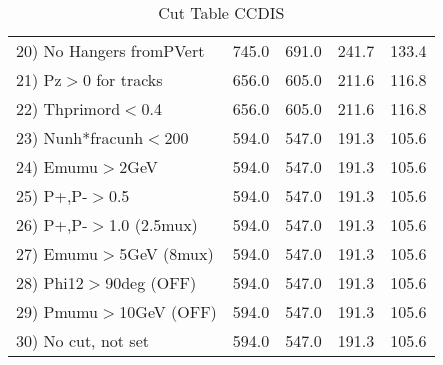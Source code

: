 \begin{table}[h!]
\begin{tabular}{||l||r|r|r|r||}
 20) No Hangers fromPVert &       745.0 &       691.0 &       241.7 &       133.4 \\
 21) Pz$>$0 for tracks    &       656.0 &       605.0 &       211.6 &       116.8 \\
 22) Thprimord$<$0.4      &       656.0 &       605.0 &       211.6 &       116.8 \\
 23) Nunh*fracunh$<$200   &       594.0 &       547.0 &       191.3 &       105.6 \\
 24) Emumu$>$2GeV         &       594.0 &       547.0 &       191.3 &       105.6 \\
 25) P+,P-$>$0.5          &       594.0 &       547.0 &       191.3 &       105.6 \\
 26) P+,P-$>$1.0 (2.5mux) &       594.0 &       547.0 &       191.3 &       105.6 \\
 27) Emumu$>$5GeV  (8mux) &       594.0 &       547.0 &       191.3 &       105.6 \\
 28) Phi12$>$90deg  (OFF) &       594.0 &       547.0 &       191.3 &       105.6 \\
 29) Pmumu$>$10GeV  (OFF) &       594.0 &       547.0 &       191.3 &       105.6 \\
 30) No cut, not set      &       594.0 &       547.0 &       191.3 &       105.6 \\
 \hline
 \hline
 \end{tabular}
 \caption{Cut Table  CCDIS  }
 \label{tab-cut_ccdis}
 \end{table}
